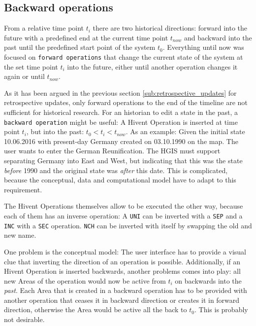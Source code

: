 
\subsection{Backward operations} %
\label{sub:backward_operations}

From a relative time point $t_i$ there are two historical directions: forward into the future with a predefined end at the current time point $t_{now}$ and backward into the past until the predefined start point of the system $t_0$. Everything until now was focused on \texttt{forward operations} that change the current state of the system at the set time point $t_i$ into the future, either until another operation changes it again or until $t_{now}$.

As it has been argued in the previous section \ref{sub:retrospective_updates} for retrospective updates, only forward operations to the end of the timeline are not sufficient for historical research. For an historian to edit a state in the past, a \texttt{backward operation} might be useful: A Hivent Operation is inserted at time point $t_i$, but into the past: $ t_0 < t_i < t_{now}$. As an example: Given the initial state 10.06.2016 with present-day Germany created on 03.10.1990 on the map. The user wants to enter the German Reunification. The HGIS must support separating Germany into East and West, but indicating that this was the state \emph{before} 1990 and the original state was \emph{after} this date. This is complicated, because the conceptual, data and computational model have to adapt to this requirement.

The Hivent Operations themselves allow to be executed the other way, because each of them has an inverse operation: A \texttt{UNI} can be inverted with a \texttt{SEP} and a \texttt{INC} with a \texttt{SEC} operation. \texttt{NCH} can be inverted with itself by swapping the old and new name.

One problem is the conceptual model: The user interface has to provide a visual clue that inverting the direction of an operation is possible. Additionally, if an Hivent Operation is inserted backwards, another problems comes into play: all new Areas of the operation would now be active from $t_i$ on backwards into the \emph{past}. Each Area that is created in a backward operation has to be provided with another operation that ceases it in backward direction or creates it in forward direction, otherwise the Area would be active all the back to $t_0$. This is probably not desirable.



